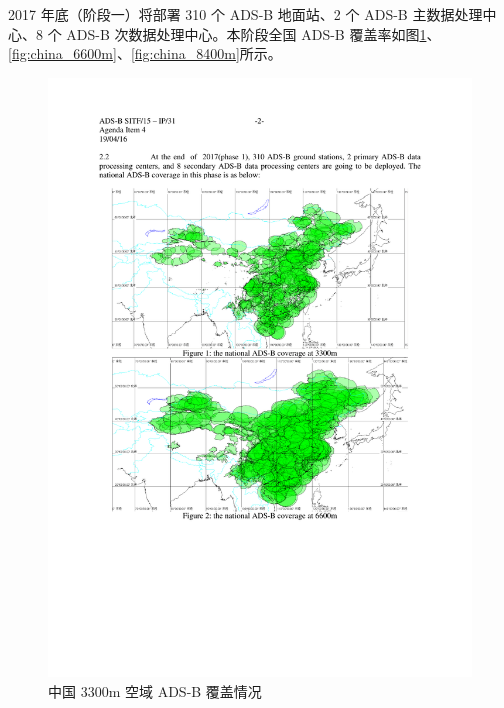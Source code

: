 2017 年底（阶段一）将部署 310 个 ADS-B 地面站、2 个 ADS-B 主数据处理中心、8 个 ADS-B 次数据处理中心。本阶段全国 ADS-B 覆盖率如图\ref{fig:china_3300m}、\ref{fig:china_6600m}、\ref{fig:china_8400m}所示。

\begin{figure}[htbp]
\centering
\includegraphics[width=12cm]{pic/china_3300m.pdf}
\caption{中国 3300m 空域 ADS-B 覆盖情况\protect\footnotemark}
\label{fig:china_3300m}
\end{figure}


